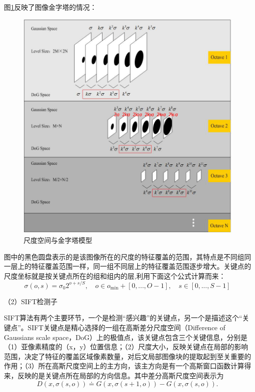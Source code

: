 图\ref{fig:DoG}反映了图像金字塔的情况：

\begin{figure}
\centering\includegraphics[width=15cm]{imgs/ch2/DoG}
\caption{尺度空间与金字塔模型}
\label{fig:DoG}
\end{figure}

图中的黑色圆盘表示的是该图像所在的尺度的特征覆盖的范围，其特点是不同组同一层上的特征覆盖范围一样，同一组不同层上的特征覆盖范围逐步增大。关键点的尺度坐标就是按关键点所在的组和组内的层,利用下面这个公式计算而来：
\begin{equation}
  \sigma(o,s) = \sigma_0 2^{o+s/S},
  \quad o \in o_{\min} + [0, ..., O-1],
  \quad s \in [0,...,S-1]
\end{equation}

（2）SIFT检测子

SIFT算法有两个主要环节，一个是检测“感兴趣”的关键点，另一个是描述这个“关键点”。SIFT关键点是精心选择的一组在高斯差分尺度空间（Difference of Gaussians scale space，DoG）上的极值点，该关键点包含三个关键信息，分别是（1）亚像素精度的（x，y）位置信息；（2）尺度大小，反映关键点在局部的影响范围，决定了特征的覆盖区域像素数量，对后文局部图像块的提取起到至关重要的作用；（3）所在高斯尺度空间上的主方向，该主方向是有一个高斯窗口函数计算得来，反映的是关键点所在局部的方向信息。其中差分高斯尺度空间表示为
\begin{equation}
  D(x,\sigma(s,o)) \doteq G(x,\sigma(s+1,o)) - G(x,\sigma(s,o)).
\end{equation}

